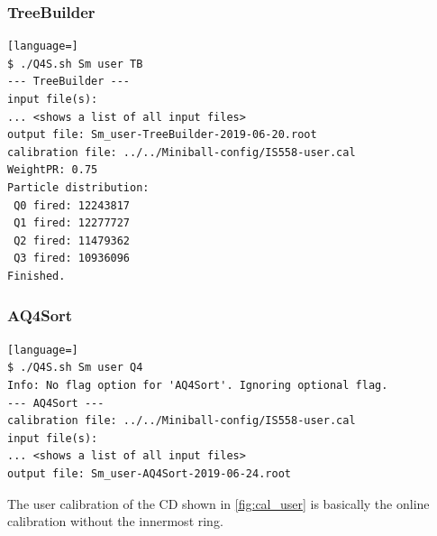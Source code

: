 \documentclass[twoside,english]{uiofysmaster/uiofysmaster}
\begin{document}
\subsubsection*{TreeBuilder}
\begin{lstlisting}[language=]
$ ./Q4S.sh Sm user TB
--- TreeBuilder ---
input file(s):
... <shows a list of all input files>
output file: Sm_user-TreeBuilder-2019-06-20.root
calibration file: ../../Miniball-config/IS558-user.cal
WeightPR: 0.75
Particle distribution:
 Q0 fired: 12243817
 Q1 fired: 12277727
 Q2 fired: 11479362
 Q3 fired: 10936096
Finished.
\end{lstlisting}


\subsubsection*{AQ4Sort}
\begin{lstlisting}[language=]
$ ./Q4S.sh Sm user Q4
Info: No flag option for 'AQ4Sort'. Ignoring optional flag.
--- AQ4Sort ---
calibration file: ../../Miniball-config/IS558-user.cal
input file(s):
... <shows a list of all input files>
output file: Sm_user-AQ4Sort-2019-06-24.root
\end{lstlisting}



The user calibration of the CD shown in \autoref{fig:cal_user} is basically the online calibration without the innermost ring. 
\end{document}
